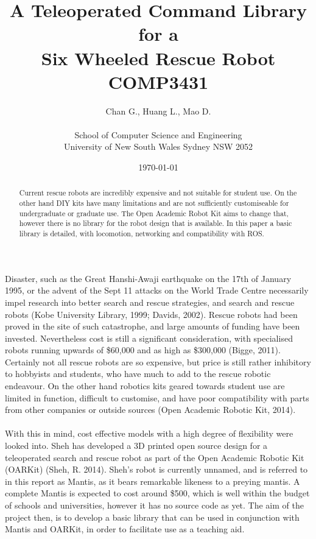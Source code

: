 \documentclass[]{article}
\title{A Teleoperated Command Library for a \\ Six Wheeled Rescue Robot \\ COMP3431}
\author{Chan G., Huang L., Mao D.\\\\
\small School of Computer Science and Engineering\\[-0.8ex]
\small University of New South Wales Sydney NSW 2052}
\date{\small\today}
\begin{document}
\maketitle %

\begin{abstract}
Current rescue robots are incredibly expensive and not suitable for student use. On the other hand DIY kits have many limitations and are not sufficiently customiseable for undergraduate or graduate use. The Open Academic Robot Kit aims to change that, however there is no library for the robot design that is available. In this paper a basic library is detailed, with locomotion, networking and compatibility with ROS.
\end{abstract}

\section{}
Disaster, such as the Great Hanshi-Awaji earthquake on the 17th of January 1995, or the advent of the Sept 11 attacks on the World Trade Centre necessarily impel research into better search and rescue strategies, and search and rescue robots (Kobe University Library, 1999; Davids, 2002). Rescue robots had been proved in the site of such catastrophe, and large amounts of funding have been invested. Nevertheless cost is still a significant consideration, with specialised robots running upwards of \$60,000 and as high as \$300,000 (Bigge, 2011). Certainly not all rescue robots are so expensive, but price is still rather inhibitory to hobbyists and students, who have much to add to the rescue robotic endeavour. On the other hand robotics kits geared towards student use are limited in function, difficult to customise, and have poor compatibility with parts from other companies or outside sources (Open Academic Robotic Kit, 2014).
\\
\\
With this in mind, cost effective models with a high degree of flexibility were looked into. Sheh has developed a 3D printed open source design for a teleoperated search and rescue robot as part of the Open Academic Robotic Kit (OARKit) (Sheh, R. 2014). Sheh's robot is currently unnamed, and is referred to in this report as Mantis, as it bears remarkable likeness to a preying mantis. A complete Mantis is expected to cost around \$500, which is well within the budget of schools and universities, however it has no source code as yet. The aim of the project then, is to develop a basic library that can be used in conjunction with Mantis and OARKit, in order to facilitate use as a teaching aid.
\end{document}
